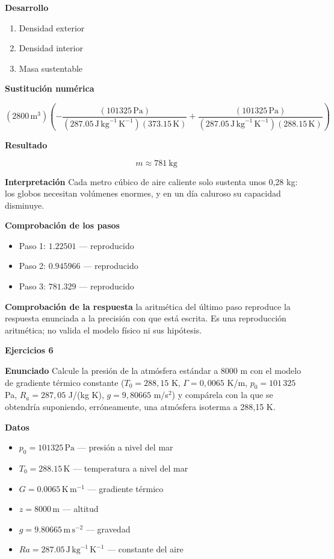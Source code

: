 \documentclass[10pt,openany]{book}
\begin{document}
\noindent\textbf{Desarrollo}
\begin{enumerate}
\item
Densidad exterior
\item
Densidad interior
\item
Masa sustentable
\end{enumerate}

\noindent\textbf{Sustitución numérica}

\[
\left(2800\,\mathrm{m}^{3}\right) \left(- \frac{\left(101325\,\mathrm{Pa}\right)}{\left(287.05\,\mathrm{J}\,\mathrm{kg}^{-1}\,\mathrm{K}^{-1}\right) \left(373.15\,\mathrm{K}\right)} + \frac{\left(101325\,\mathrm{Pa}\right)}{\left(287.05\,\mathrm{J}\,\mathrm{kg}^{-1}\,\mathrm{K}^{-1}\right) \left(288.15\,\mathrm{K}\right)}\right)
\]

\noindent\textbf{Resultado}

\[
m \approx 781\ \mathrm{kg}
\]

\noindent\textbf{Interpretación}
Cada metro cúbico de aire caliente solo sustenta unos 0,28 kg: los globos necesitan volúmenes enormes, y en un día caluroso su capacidad disminuye.

\noindent\textbf{Comprobación de los pasos}
\begin{itemize}
\item Paso 1: $1.22501$ — reproducido
\item Paso 2: $0.945966$ — reproducido
\item Paso 3: $781.329$ — reproducido
\end{itemize}

\noindent\textbf{Comprobación de la respuesta} la aritmética del último paso reproduce la respuesta enunciada a la precisión con que está escrita. Es una reproducción aritmética; no valida el modelo físico ni sus hipótesis.

\noindent\textbf{Ejercicios 6}

\noindent\textbf{Enunciado}
Calcule la presión de la atmósfera estándar a 8000 m con el modelo de gradiente térmico constante (\(T_0 = 288{,}15\) K, \(\Gamma = 0{,}0065\) K/m, \(p_0 = 101\,325\) Pa, \(R_a = 287{,}05\) J/(kg K), \(g = 9{,}80665\) m/s\(^2\)) y compárela con la que se obtendría suponiendo, erróneamente, una atmósfera isoterma a 288,15 K.

\noindent\textbf{Datos}
\begin{itemize}
\item $p_{0} = 101325\,\mathrm{Pa}$ — presión a nivel del mar
\item $T_{0} = 288.15\,\mathrm{K}$ — temperatura a nivel del mar
\item $G = 0.0065\,\mathrm{K}\,\mathrm{m}^{-1}$ — gradiente térmico
\item $z = 8000\,\mathrm{m}$ — altitud
\item $g = 9.80665\,\mathrm{m}\,\mathrm{s}^{-2}$ — gravedad
\item $Ra = 287.05\,\mathrm{J}\,\mathrm{kg}^{-1}\,\mathrm{K}^{-1}$ — constante del aire
\end{itemize}
\end{document}

